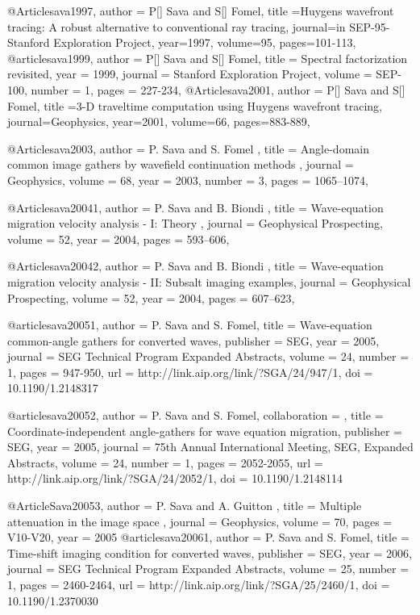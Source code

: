 @Article{sava1997,
  author = {P[] Sava and S[] Fomel},
  title ={Huygens wavefront tracing: A robust alternative to conventional ray tracing},
  journal={in SEP-95-Stanford Exploration Project},
  year=1997,
  volume=95,
  pages={101-113},
}
@article{sava1999,
  author =	 {P[] Sava and S[] Fomel},
  title =	 {Spectral factorization revisited},
  year =	 1999,
  journal =	 {Stanford Exploration Project},
  volume =	 SEP-100,
  number =	 1,
  pages =	 {227-234},
}
@Article{sava2001,
  author = {P[] Sava and S[] Fomel},
  title ={3-D traveltime computation using Huygens wavefront tracing},
  journal={Geophysics},
  year=2001,
  volume=66,
  pages={883-889},
}

@Article{sava2003,
  author =	 { P. Sava and S. Fomel },
  title =	 { Angle-domain common image gathers by wavefield
                  continuation methods },
  journal =	 {Geophysics},
  volume =	 68,
  year =	 2003,
  number =	 3,
  pages =	 {1065--1074},
}

@Article{sava20041,
 author =  { P. Sava and B. Biondi },
 title =   { Wave-equation migration velocity analysis - {I}: {Theory} },
 journal = {Geophysical Prospecting},
 volume = {52},
 year =   {2004},
 pages =  {593--606},
}

@Article{sava20042,
 author =  { P. Sava and B. Biondi },
 title =   { Wave-equation migration velocity analysis - {II}:
{Subsalt} imaging examples},
 journal = {Geophysical Prospecting},
 volume = {52},
 year =   {2004},
 pages =  {607--623},
}

@article{sava20051,
  author =	 {P. Sava and S. Fomel},
  title =	 {Wave-equation common-angle gathers for converted
                  waves},
  publisher =	 {SEG},
  year =	 2005,
  journal =	 {SEG Technical Program Expanded Abstracts},
  volume =	 24,
  number =	 1,
  pages =	 {947-950},
  url =		 {http://link.aip.org/link/?SGA/24/947/1},
  doi =		 {10.1190/1.2148317}
}

@article{sava20052,
author = {P. Sava and S. Fomel},
collaboration = {},
title = {Coordinate-independent angle-gathers for wave equation migration},
publisher = {SEG},
year = {2005},
journal = {75th Annual International Meeting, SEG, Expanded Abstracts},
volume = {24},
number = {1},
pages = {2052-2055},
url = {http://link.aip.org/link/?SGA/24/2052/1},
doi = {10.1190/1.2148114}
}

@Article{Sava20053,
  author =	 { P. Sava and A. Guitton },
  title =	 { Multiple attenuation in the image space },
  journal =	 {Geophysics},
  volume =	 70,
  pages =	 {V10-V20},
  year =	 2005
}
@article{sava20061,
  author =	 {P. Sava and S. Fomel},
  title =	 {Time-shift imaging condition for converted waves},
  publisher =	 {SEG},
  year =	 2006,
  journal =	 {SEG Technical Program Expanded Abstracts},
  volume =	 25,
  number =	 1,
  pages =	 {2460-2464},
  url =		 {http://link.aip.org/link/?SGA/25/2460/1},
  doi =		 {10.1190/1.2370030}
}


